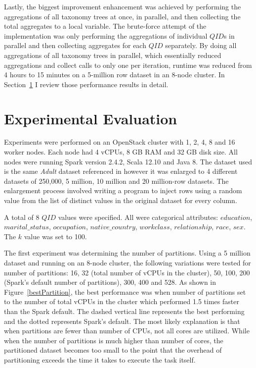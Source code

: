 \documentclass[11pt]{article}       %
\newcommand{\includeFig}[3]      {\begin{figure}[htb] \begin{center}
                                 \includegraphics
                                 [width=4in,keepaspectratio] %
                                 {#2}\caption{\label{#1}#3} \end{center} \end{figure}}
\begin{document}
Lastly, the biggest improvement enhancement was achieved by performing the aggregations of all taxonomy trees at once, in parallel, and then collecting the total aggregates to a local variable. The brute-force attempt of the implementation was only performing the aggregations of individual $QID$s in parallel and then collecting aggregates for each $QID$ separately. By doing all aggregations of all taxonomy trees in parallel, which essentially reduced aggregations and collect calls to only one per iteration, runtime was reduced from 4 hours to 15 minutes on a 5-million row dataset in an 8-node cluster. In Section~\ref{evaluation} I review those performance results in detail.


\section{Experimental Evaluation} \label{evaluation}

Experiments were performed on an OpenStack cluster with 1, 2, 4, 8 and 16 worker nodes. Each node had 4 vCPUs, 8 GB RAM and 32 GB disk size. All nodes were running Spark version 2.4.2, Scala 12.10 and Java 8. The dataset used is the same \emph{Adult} dataset referenced in \cite{Sopaoglu:2017} however it was enlarged to 4 different datasets of 250,000, 5 million, 10 million and 20 million-row datasets. The enlargement process involved writing a program to inject rows using a random value from the list of distinct values in the original dataset for every column.

A total of 8 $QID$ values were specified. All were categorical attributes: $education$, $marital\_status$, $occupation$, $native\_country$, $workclass$, $relationship$, $race$, $sex$. The $k$ value was set to 100.

The first experiment was determining the number of partitions. Using a 5 million dataset and running on an 8-node cluster, the following variations were tested for number of partitions: 16, 32 (total number of vCPUs in the cluster), 50, 100, 200 (Spark's default number of partitions), 300, 400 and 528. As shown in Figure~\ref{bestPartition}, the best performance was when number of partitions set to the number of total vCPUs in the cluster which performed 1.5 times faster than the Spark default. The dashed vertical line represents the best performing and the dotted represents Spark's default. The most likely explanation is that when partitions are fewer than number of CPUs, not all cores are utilized. While when the number of partitions is much higher than number of cores, the partitioned dataset becomes too small to the point that the overhead of partitioning exceeds the time it takes to execute the task itself.
\end{document}
